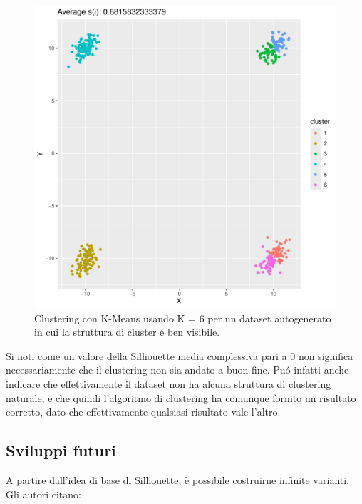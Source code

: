 \documentclass[italian]{article}
\begin{document}
		\begin{figure}
			\includegraphics[width = \textwidth]{doc/clusters-6.pdf}
			\caption{Clustering con K-Means usando K = 6 per un dataset
			autogenerato in cui la struttura di cluster é ben visibile. }
			\label{fig:c6}
		\end{figure}

		Si noti come un valore della Silhouette media complessiva
		pari a $0$ non significa necessariamente che il clustering
		non sia andato a buon fine. Puó infatti anche indicare che
		effettivamente il dataset non ha alcuna struttura di clustering
		naturale, e che quindi l'algoritmo di clustering ha comunque
		fornito un risultato corretto, dato che effettivamente qualsiasi
		risultato vale l'altro.

	\subsection{Sviluppi futuri}

		A partire dall'idea di base di Silhouette, è possibile costruirne
		infinite varianti. Gli autori citano:
\end{document}
